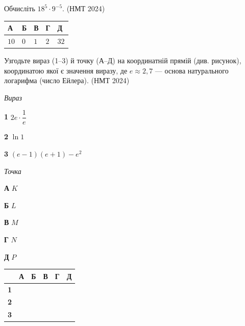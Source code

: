 \documentclass[14pt]{extarticle}
\newcommand{\answerTable}[5]{
\begin{center}
\begin{tabular}{|*{5}{>{\centering\arraybackslash}m{2.8cm}|}}
\hline
\rule[-0.3cm]{0pt}{0.8cm}\textbf{А} & \textbf{Б} & \textbf{В} & \textbf{Г} & \textbf{Д} \\
\hline
\rule[-0.4cm]{0pt}{1.0cm}#1 & \rule[-0.4cm]{0pt}{1.0cm}#2 & \rule[-0.4cm]{0pt}{1.0cm}#3 & \rule[-0.4cm]{0pt}{1.0cm}#4 & \rule[-0.4cm]{0pt}{1.0cm}#5 \\
\hline
\end{tabular}
\end{center}
}
\newcommand{\matchTable}{
\begin{tabular}{|>{\centering\arraybackslash}p{0.2cm}|*{5}{>{\centering\arraybackslash}p{0.2cm}|}}
\hline
& \textbf{А} & \textbf{Б} & \textbf{В} & \textbf{Г} & \textbf{Д} \\
\hline
\textbf{1} & \rule{0pt}{0.2cm} & & & & \\
\hline
\textbf{2} & \rule{0pt}{0.2cm} & & & & \\
\hline
\textbf{3} & \rule{0pt}{0.2cm} & & & & \\
\hline
\end{tabular}
}
\newcommand{\task}[2]{\noindent\makebox[1.5em][l]{\textbf{#1.}}\parbox[t]{\dimexpr\textwidth-1.5em}{#2}}
\newcommand{\nmtyear}[1]{\hfill{\small\color{yearcolor}(НМТ #1)}}
\begin{document}
\task{37}{Обчисліть $18^5 \cdot 9^{-5}$. \nmtyear{2024}}
\answerTable{$10$}{$0$}{$1$}{$2$}{$32$}

\vspace{0.5cm}

\task{38}{Узгодьте вираз (1--3) й точку (А--Д) на координатній прямій (див. рисунок), координатою якої є значення виразу, де $e \approx 2{,}7$ --- основа натурального логарифма (число Ейлера). \nmtyear{2024}}

\vspace{0.3cm}
\begin{center}
\end{center}

\vspace{0.3cm}
\begin{minipage}{0.4\textwidth}
\textit{Вираз}

\vspace{0.2cm}
\textbf{1} \quad $2e \cdot \dfrac{1}{e}$

\vspace{0.3cm}
\textbf{2} \quad $\ln 1$

\vspace{0.2cm}
\textbf{3} \quad $(e - 1)(e + 1) - e^2$
\end{minipage}
\hfill
\begin{minipage}{0.35\textwidth}
\textit{Точка}

\vspace{0.2cm}
\textbf{А} \quad $K$

\vspace{0.2cm}
\textbf{Б} \quad $L$

\vspace{0.2cm}
\textbf{В} \quad $M$

\vspace{0.2cm}
\textbf{Г} \quad $N$

\vspace{0.2cm}
\textbf{Д} \quad $P$
\end{minipage}
\hfill
\begin{minipage}{0.15\textwidth}
\matchTable
\end{minipage}
\end{document}
